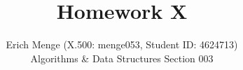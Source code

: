 \documentclass[12pt]{article}
\begin{document}

\title{Homework X}%
\author{Erich Menge (X.500: menge053, Student ID: 4624713) \\ %
Algorithms \& Data Structures Section 003} %

\maketitle

\end{document}
